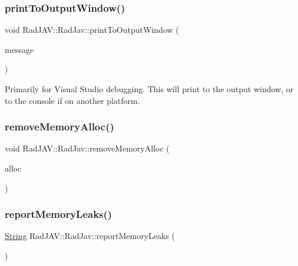 \subsubsection{\texorpdfstring{print\+To\+Output\+Window()}{printToOutputWindow()}}
{\footnotesize\ttfamily void Rad\+J\+A\+V\+::\+Rad\+Jav\+::print\+To\+Output\+Window (\begin{DoxyParamCaption}\item[{\mbox{\hyperlink{class_rad_j_a_v_1_1_string}{String}}}]{message }\end{DoxyParamCaption})\hspace{0.3cm}{\ttfamily [static]}}

Primarily for Visual Studio debugging. This will print to the output window, or to the console if on another platform. \mbox{\label{class_rad_j_a_v_1_1_rad_jav_a6226fe15f13446edc493596b6c029cb7}} 
\subsubsection{\texorpdfstring{remove\+Memory\+Alloc()}{removeMemoryAlloc()}}
{\footnotesize\ttfamily void Rad\+J\+A\+V\+::\+Rad\+Jav\+::remove\+Memory\+Alloc (\begin{DoxyParamCaption}\item[{\mbox{\hyperlink{class_rad_j_a_v_1_1_memory_alloc_log}{Memory\+Alloc\+Log}}}]{alloc }\end{DoxyParamCaption})\hspace{0.3cm}{\ttfamily [static]}}

\mbox{\label{class_rad_j_a_v_1_1_rad_jav_a26e6e428425568f87a7ac59e2eef5359}} 
\subsubsection{\texorpdfstring{report\+Memory\+Leaks()}{reportMemoryLeaks()}}
{\footnotesize\ttfamily \mbox{\hyperlink{class_rad_j_a_v_1_1_string}{String}} Rad\+J\+A\+V\+::\+Rad\+Jav\+::report\+Memory\+Leaks (\begin{DoxyParamCaption}{ }\end{DoxyParamCaption})\hspace{0.3cm}{\ttfamily [static]}}

